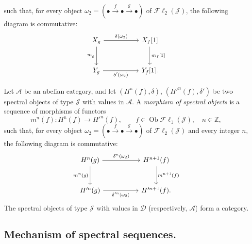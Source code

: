 \clearpage
{}%
\begingroup\small\setlength{\parskip}{0pt}\setlength{\emergencystretch}{1.5em}
such that, for every object
$\omega_2=(\mathord\bullet\xrightarrow f\mathord\bullet\xrightarrow g\mathord\bullet)$
of $\mathcal{F}\ell_2(\mathcal J)$, the following diagram is commutative:
\[
\begin{tikzcd}[column sep=5.2em,row sep=2.7em]
X_g\arrow[r,"{\delta(\omega_2)}"]\arrow[d,"{m_g}"']&X_f[1]\arrow[d,"{m_f[1]}"]\\
Y_g\arrow[r,"{\delta'(\omega_2)}"']&Y_f[1].
\end{tikzcd}
\]

Let $\mathcal A$ be an abelian category, and let $(H^n(f),\delta)$,
$(H'^{n}(f),\delta')$ be two spectral objects of type $\mathcal J$ with
values in $\mathcal A$. A \emph{morphism of spectral objects} is a sequence
of morphisms of functors
\[
m^n(f)\colon H^n(f)\longrightarrow H'^{n}(f),\qquad
f\in\operatorname{Ob}\mathcal{F}\ell_1(\mathcal J),\quad n\in\mathbb Z,
\]
such that, for every object
$\omega_2=(\mathord\bullet\xrightarrow f\mathord\bullet\xrightarrow g\mathord\bullet)$
of $\mathcal{F}\ell_2(\mathcal J)$ and every integer $n$, the following
diagram is commutative:
\[
\begin{tikzcd}[column sep=5.2em,row sep=2.7em]
H^n(g)\arrow[r,"{\delta^n(\omega_2)}"]\arrow[d,"{m^n(g)}"']&
H^{n+1}(f)\arrow[d,"{m^{n+1}(f)}"]\\
H'^{n}(g)\arrow[r,"{\delta'^{n}(\omega_2)}"']&H'^{n+1}(f).
\end{tikzcd}
\]
The spectral objects of type $\mathcal J$ with values in $\mathcal D$
(respectively, $\mathcal A$) form a category.

\subsection{Mechanism of spectral sequences.}

